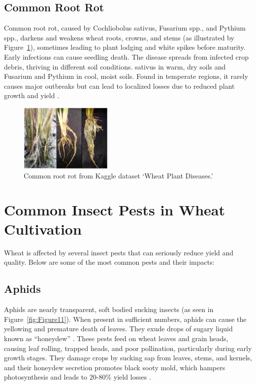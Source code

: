 \subsection{Common Root Rot}

Common root rot, caused by Cochliobolus sativus, Fusarium spp., and Pythium spp., darkens and weakens wheat roots, crowns, and stems (as illustrated by Figure~\ref{fig:Figure10}), sometimes leading to plant lodging and white spikes before maturity. Early infections can cause seedling death.
The disease spreads from infected crop debris, thriving in different soil conditions. sativus in warm, dry soils and Fusarium and Pythium in cool, moist soils. Found in temperate regions, it rarely causes major outbreaks but can lead to localized losses due to reduced plant growth and yield \parencite{duveiller2012wheat}.

\begin{figure}[H]
    \centering
    \includegraphics[width=0.4\textwidth]{chapters/chapter2/images/Figure10.png}
    \caption{Common root rot from Kaggle dataset ‘Wheat Plant Diseases.’}
    \label{fig:Figure10}
\end{figure}

\section{Common Insect Pests in Wheat Cultivation}
Wheat is affected by several insect pests that can seriously reduce yield and quality. Below are some of the most common pests and their impacts:

\subsection{Aphids }  
Aphids are nearly transparent, soft bodied sucking insects (as seen in Figure~\ref{fig:Figure11}). When present in sufficient numbers, aphids can cause the yellowing and premature death of leaves. They exude drops of sugary liquid known as “honeydew” \parencite{duveiller2012wheat}.
These pests feed on wheat leaves and grain heads, causing leaf rolling, trapped heads, and poor pollination, particularly during early growth stages. They damage crops by sucking sap from leaves, stems, and kernels, and their honeydew secretion promotes black sooty mold, which hampers photosynthesis and leads to 20-80\% yield losses \parencite{farook2019insect}.

